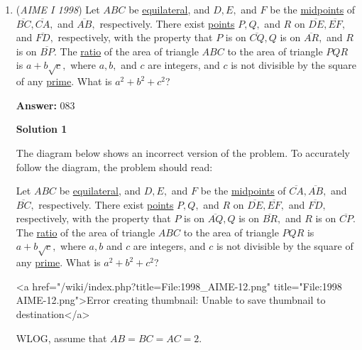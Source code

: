 \begin{enumerate}
	\item (\textit{AIME I 1998}) Let $ABC$ be \href{https://artofproblemsolving.com/wiki/index.php?title=Equilateral\_triangle}{equilateral}, and $D, E,$ and $F$ be the \href{https://artofproblemsolving.com/wiki/index.php?title=Midpoint}{midpoints} of $\overline{BC}, \overline{CA},$ and $\overline{AB},$ respectively.  There exist \href{https://artofproblemsolving.com/wiki/index.php?title=Point}{points} $P, Q,$ and $R$ on $\overline{DE}, \overline{EF},$ and $\overline{FD},$ respectively, with the property that $P$ is on $\overline{CQ}, Q$ is on $\overline{AR},$ and $R$ is on $\overline{BP}.$  The \href{https://artofproblemsolving.com/wiki/index.php?title=Ratio}{ratio} of the area of triangle $ABC$ to the area of triangle $PQR$ is $a + b\sqrt {c},$ where $a, b,$ and $c$ are integers, and $c$ is not divisible by the square of any \href{https://artofproblemsolving.com/wiki/index.php?title=Prime}{prime}.  What is $a^{2} + b^{2} + c^{2}$?


 
 \textbf{Answer: }083



\textbf{Solution 1}

The diagram below shows an incorrect version of the problem. To accurately follow the diagram, the problem should read:

 Let $ABC$ be \href{https://artofproblemsolving.com/wiki/index.php?title=Equilateral\_triangle}{equilateral}, and $D, E,$ and $F$ be the \href{https://artofproblemsolving.com/wiki/index.php?title=Midpoint}{midpoints} of $\overline{CA}, \overline{AB},$ and $\overline{BC},$ respectively.  There exist \href{https://artofproblemsolving.com/wiki/index.php?title=Point}{points} $P, Q,$ and $R$ on $\overline{DE}, \overline{EF},$ and $\overline{FD},$ respectively, with the property that $P$ is on $\overline{AQ}, Q$ is on $\overline{BR},$ and $R$ is on $\overline{CP}.$  The \href{https://artofproblemsolving.com/wiki/index.php?title=Ratio}{ratio} of the area of triangle $ABC$ to the area of triangle $PQR$ is $a + b\sqrt {c},$ where $a, b$ and $c$ are integers, and $c$ is not divisible by the square of any \href{https://artofproblemsolving.com/wiki/index.php?title=Prime}{prime}.  What is $a^{2} + b^{2} + c^{2}$?

 


 <a href="/wiki/index.php?title=File:1998\_AIME-12.png" title="File:1998 AIME-12.png">Error creating thumbnail: Unable to save thumbnail to destination</a>

 WLOG, assume that $AB = BC = AC = 2$.


\end{enumerate}

